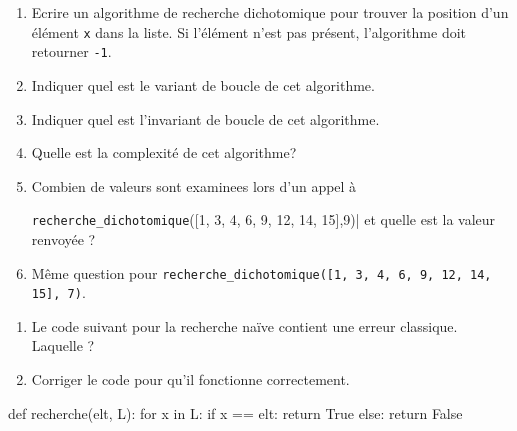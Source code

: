 \documentclass[11pt, a4paper]{report}
\begin{document}
\begin{exercice_cours}
    
    \begin{enumerate}
        \item     Ecrire un algorithme de recherche dichotomique pour trouver la position d'un élément \verb|x| dans la liste. Si l'élément n'est pas présent, l'algorithme doit retourner \verb|-1|.


\item Indiquer quel est le variant de boucle de cet algorithme. \hfill{}
    \item Indiquer quel est l'invariant de boucle de cet algorithme. \hfill
    
    \item Quelle est la complexité de cet algorithme? \hfill{}  

    \item Combien de valeurs sont examinees lors d’un appel à 
    
    \verb|recherche_dichotomique|([1, 3, 4, 6, 9, 12, 14, 15],9)| et quelle est la valeur renvoyée ?
    
            \reponseLigne[0.8\linewidth]{}

    \item Même question pour \verb|recherche_dichotomique([1, 3, 4, 6, 9, 12, 14, 15], 7)|.

            \reponseLigne[0.8\linewidth]{}

\end{enumerate}

\end{exercice_cours}


\begin{minipage}{0.48\linewidth}
        \begin{exercice_cours}[Débogage]
            \begin{enumerate}
                \item Le code suivant pour la recherche naïve contient une erreur classique. Laquelle ?
                \item Corriger le code pour qu'il fonctionne correctement.
            \end{enumerate}
    \end{exercice_cours}

    \end{minipage}\hfill
    \begin{minipage}{0.48\linewidth}
    \begin{CodePythontexAlt}[TaillePolice=\large, Largeur=1\linewidth,Centre,Lignes=true,PremLigne=1]{}
def recherche(elt, L):
    for x in L:
        if x == elt:
            return True
        else:
            return False
    \end{CodePythontexAlt}
    \end{minipage}
\end{document}
